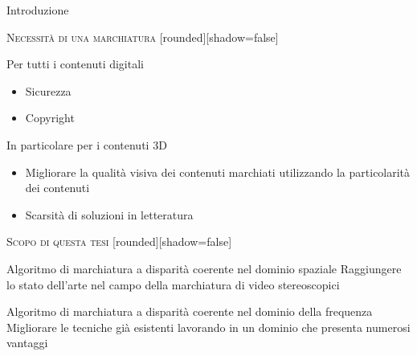 \documentclass{beamer}
\begin{document}
\begin{section}{Introduzione}
\begin{frame}[t]{\textsc{Necessit\`{a} di una marchiatura}}
[rounded][shadow=false]
\begin{center}
\begin{block}{Per tutti i contenuti digitali}
\begin{itemize}
\item  Sicurezza
\item  Copyright
\end{itemize}
\end{block}
\vspace{1em}
\begin{block}{In particolare per i contenuti 3D}
\begin{itemize}
\item Migliorare la qualit\`{a} visiva dei contenuti marchiati utilizzando la particolarit\`{a} dei contenuti
\item Scarsit\`{a} di soluzioni in letteratura
\end{itemize}
\end{block}
\end{center}
\end{frame}


\begin{frame}[t]{\textsc{Scopo di questa tesi}}
	[rounded][shadow=false]
\begin{center}
\begin{block}{Algoritmo di marchiatura a disparit\`{a} coerente nel dominio spaziale}
Raggiungere lo stato dell'arte nel campo della marchiatura di video stereoscopici
\end{block}
\vspace{1em}
\begin{block}{Algoritmo di marchiatura a disparit\`{a} coerente nel dominio della frequenza}
Migliorare le tecniche gi\`{a} esistenti lavorando in un dominio che presenta numerosi vantaggi

\end{block}
\end{center}
\end{frame}

\end{section}
\end{document}
